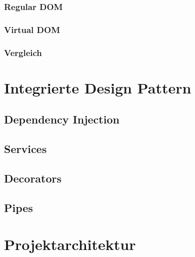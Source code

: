 \subsubsection{Regular DOM}
\subsubsection{Virtual DOM}
\subsubsection{Vergleich}

\section{Integrierte Design Pattern}
\subsection{Dependency Injection}
\subsection{Services}
\subsection{Decorators}
\subsection{Pipes}

\section{Projektarchitektur}